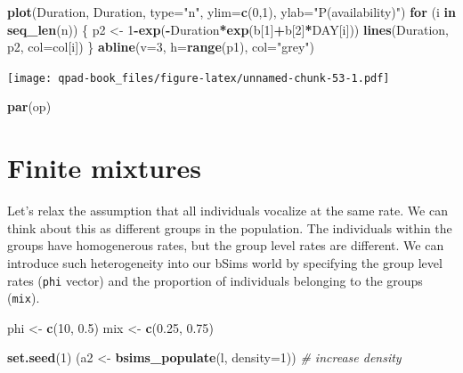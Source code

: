 \documentclass[12pt,]{book}
\newenvironment{Shaded}{\begin{snugshade}}{\end{snugshade}}
\newcommand{\CommentTok}[1]{\textcolor[rgb]{0.56,0.35,0.01}{\textit{#1}}}
\newcommand{\ControlFlowTok}[1]{\textcolor[rgb]{0.13,0.29,0.53}{\textbf{#1}}}
\newcommand{\DataTypeTok}[1]{\textcolor[rgb]{0.13,0.29,0.53}{#1}}
\newcommand{\DecValTok}[1]{\textcolor[rgb]{0.00,0.00,0.81}{#1}}
\newcommand{\FloatTok}[1]{\textcolor[rgb]{0.00,0.00,0.81}{#1}}
\newcommand{\KeywordTok}[1]{\textcolor[rgb]{0.13,0.29,0.53}{\textbf{#1}}}
\newcommand{\NormalTok}[1]{#1}
\newcommand{\OperatorTok}[1]{\textcolor[rgb]{0.81,0.36,0.00}{\textbf{#1}}}
\newcommand{\StringTok}[1]{\textcolor[rgb]{0.31,0.60,0.02}{#1}}
\begin{document}
\begin{Shaded}
\begin{Highlighting}[]
\KeywordTok{plot}\NormalTok{(Duration, Duration, }\DataTypeTok{type=}\StringTok{"n"}\NormalTok{, }\DataTypeTok{ylim=}\KeywordTok{c}\NormalTok{(}\DecValTok{0}\NormalTok{,}\DecValTok{1}\NormalTok{),}
    \DataTypeTok{ylab=}\StringTok{"P(availability)"}\NormalTok{)}
\ControlFlowTok{for}\NormalTok{ (i }\ControlFlowTok{in} \KeywordTok{seq_len}\NormalTok{(n)) \{}
\NormalTok{    p2 <-}\StringTok{ }\DecValTok{1}\OperatorTok{-}\KeywordTok{exp}\NormalTok{(}\OperatorTok{-}\NormalTok{Duration}\OperatorTok{*}\KeywordTok{exp}\NormalTok{(b[}\DecValTok{1}\NormalTok{]}\OperatorTok{+}\NormalTok{b[}\DecValTok{2}\NormalTok{]}\OperatorTok{*}\NormalTok{DAY[i]))}
    \KeywordTok{lines}\NormalTok{(Duration, p2, }\DataTypeTok{col=}\NormalTok{col[i])}
\NormalTok{\}}
\KeywordTok{abline}\NormalTok{(}\DataTypeTok{v=}\DecValTok{3}\NormalTok{, }\DataTypeTok{h=}\KeywordTok{range}\NormalTok{(p1), }\DataTypeTok{col=}\StringTok{"grey"}\NormalTok{)}
\end{Highlighting}
\end{Shaded}

\texttt{[image: qpad-book\_files/figure-latex/unnamed-chunk-53-1.pdf]}

\begin{Shaded}
\begin{Highlighting}[]
\KeywordTok{par}\NormalTok{(op)}
\end{Highlighting}
\end{Shaded}

\hypertarget{finite-mixtures}{%
\section{Finite mixtures}\label{finite-mixtures}}

Let's relax the assumption that all individuals vocalize at the same rate.
We can think about this as different groups in the population.
The individuals within the groups have homogenerous rates,
but the group level rates are different.
We can introduce such heterogeneity into our bSims world by
specifying the group level rates (\texttt{phi} vector) and the
proportion of individuals belonging to the groups (\texttt{mix}).

\begin{Shaded}
\begin{Highlighting}[]
\NormalTok{phi <-}\StringTok{ }\KeywordTok{c}\NormalTok{(}\DecValTok{10}\NormalTok{, }\FloatTok{0.5}\NormalTok{)}
\NormalTok{mix <-}\StringTok{ }\KeywordTok{c}\NormalTok{(}\FloatTok{0.25}\NormalTok{, }\FloatTok{0.75}\NormalTok{)}

\KeywordTok{set.seed}\NormalTok{(}\DecValTok{1}\NormalTok{)}
\NormalTok{(a2 <-}\StringTok{ }\KeywordTok{bsims_populate}\NormalTok{(l, }\DataTypeTok{density=}\DecValTok{1}\NormalTok{)) }\CommentTok{# increase density}
\end{Highlighting}
\end{Shaded}
\end{document}

